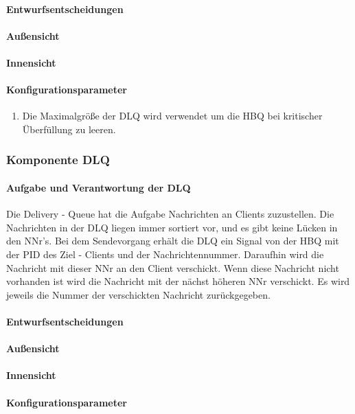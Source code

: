 \documentclass{article}
\begin{document}
			\paragraph{Entwurfsentscheidungen}
			\paragraph{Außensicht}
			\paragraph{Innensicht}
			\paragraph{Konfigurationsparameter}
				\begin{enumerate}
    				\item{Die Maximalgröße der DLQ wird verwendet um die HBQ bei kritischer 
    				Überfüllung zu leeren.}
    			\end{enumerate}
			
		\subsubsection{Komponente DLQ}
			\paragraph{Aufgabe und Verantwortung der DLQ}
				Die Delivery - Queue hat die Aufgabe Nachrichten an Clients zuzustellen. 
				Die Nachrichten in der DLQ liegen immer sortiert vor, und es gibt keine Lücken in den NNr’s.
				Bei dem Sendevorgang erhält die DLQ ein Signal von der HBQ mit der PID des Ziel - Clients und der Nachrichtennummer. Daraufhin wird die Nachricht mit dieser NNr an den Client verschickt.
				Wenn diese Nachricht nicht vorhanden ist wird die Nachricht mit der nächst höheren NNr verschickt. 
				Es wird jeweils die Nummer der verschickten Nachricht zurückgegeben.
			\paragraph{Entwurfsentscheidungen}
			\paragraph{Außensicht}
			\paragraph{Innensicht}
			\paragraph{Konfigurationsparameter}
				
\end{document}
